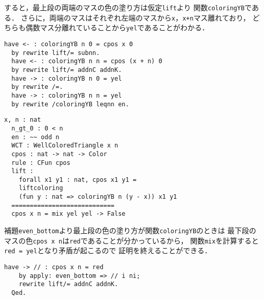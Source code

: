すると，最上段の両端のマスの色の塗り方は仮定{\tt{lift}}より
関数{\tt{coloringYB}}である．
さらに，両端のマスはそれぞれ左端のマスから{\tt{x}}，{\tt{x+n}}マス離れており，
どちらも偶数マス分離れていることから{\tt{yel}}であることがわかる．
\begin{lstlisting}[language=Coq]
  have <- : coloringYB n 0 = cpos x 0
  by rewrite lift/= subnn.
  have <- : coloringYB n n = cpos (x + n) 0
  by rewrite lift/= addnC addnK.
  have -> : coloringYB n 0 = yel
  by rewrite /=.
  have -> : coloringYB n n = yel
  by rewrite /coloringYB leqnn en.
\end{lstlisting}
\begin{lstlisting}[language=Coq]
  x, n : nat
  n_gt_0 : 0 < n
  en : ~~ odd n
  WCT : WellColoredTriangle x n
  cpos : nat -> nat -> Color
  rule : CFun cpos
  lift :
    forall x1 y1 : nat, cpos x1 y1 =
    liftcoloring
    (fun y : nat => coloringYB n (y - x)) x1 y1
  ============================
  cpos x n = mix yel yel -> False
\end{lstlisting}
補題{\tt{even\_bottom}}より最上段の色の塗り方が関数{\tt{coloringYB}}のときは
最下段のマスの色{\tt{cpos x n}}は{\tt{red}}であることが分かっているから，
関数{\tt{mix}}を計算すると{\tt{red = yel}}となり矛盾が起こるので
証明を終えることができる．
\begin{lstlisting}[language=Coq]
    have -> // : cpos x n = red
    by apply: even_bottom => // i ni;
    rewrite lift/= addnC addnK.
  Qed.
\end{lstlisting}

